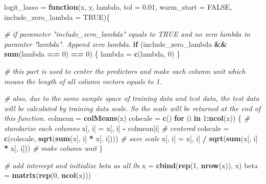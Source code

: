 \documentclass[
]{article}
\newenvironment{Shaded}{\begin{snugshade}}{\end{snugshade}}
\newcommand{\AttributeTok}[1]{\textcolor[rgb]{0.13,0.29,0.53}{#1}}
\newcommand{\CommentTok}[1]{\textcolor[rgb]{0.56,0.35,0.01}{\textit{#1}}}
\newcommand{\ConstantTok}[1]{\textcolor[rgb]{0.56,0.35,0.01}{#1}}
\newcommand{\ControlFlowTok}[1]{\textcolor[rgb]{0.13,0.29,0.53}{\textbf{#1}}}
\newcommand{\DecValTok}[1]{\textcolor[rgb]{0.00,0.00,0.81}{#1}}
\newcommand{\FloatTok}[1]{\textcolor[rgb]{0.00,0.00,0.81}{#1}}
\newcommand{\FunctionTok}[1]{\textcolor[rgb]{0.13,0.29,0.53}{\textbf{#1}}}
\newcommand{\NormalTok}[1]{#1}
\newcommand{\OtherTok}[1]{\textcolor[rgb]{0.56,0.35,0.01}{#1}}
\newcommand{\SpecialCharTok}[1]{\textcolor[rgb]{0.81,0.36,0.00}{\textbf{#1}}}
\begin{document}
\begin{Shaded}
\begin{Highlighting}[]
\NormalTok{logit\_lasso }\OtherTok{=} \ControlFlowTok{function}\NormalTok{(x, y, lambda, }\AttributeTok{tol =} \FloatTok{0.01}\NormalTok{, }\AttributeTok{warm\_start =} \ConstantTok{FALSE}\NormalTok{, }\AttributeTok{include\_zero\_lambda =} \ConstantTok{TRUE}\NormalTok{)\{}
  
  \CommentTok{\# if parameter "include\_zero\_lambda" equals to TRUE and no zero lambda in paramter "lambda". Append zero lambda.}
  \ControlFlowTok{if}\NormalTok{ (include\_zero\_lambda }\SpecialCharTok{\&\&} \FunctionTok{sum}\NormalTok{(lambda }\SpecialCharTok{==} \DecValTok{0}\NormalTok{) }\SpecialCharTok{==} \DecValTok{0}\NormalTok{) \{}
\NormalTok{    lambda }\OtherTok{=} \FunctionTok{c}\NormalTok{(lambda, }\DecValTok{0}\NormalTok{)}
\NormalTok{  \}}
  
  
  
  \CommentTok{\# this part is used to center the predictors and make each column unit which means the length of all column vectors equals to 1. }
  
  \CommentTok{\# also, due to the same sample space of training data and test data, the test data will be calculated by training data scale. So the scale will be returned at the end of this function.}
\NormalTok{  colmean }\OtherTok{=} \FunctionTok{colMeans}\NormalTok{(x)}
\NormalTok{  colscale }\OtherTok{=} \FunctionTok{c}\NormalTok{()}
  \ControlFlowTok{for}\NormalTok{ (i }\ControlFlowTok{in} \DecValTok{1}\SpecialCharTok{:}\FunctionTok{ncol}\NormalTok{(x)) \{ }\CommentTok{\# standarize each columns}
\NormalTok{    x[, i] }\OtherTok{=}\NormalTok{ x[, i] }\SpecialCharTok{{-}}\NormalTok{ colmean[i] }\CommentTok{\# centered}
\NormalTok{    colscale }\OtherTok{=} \FunctionTok{c}\NormalTok{(colscale, }\FunctionTok{sqrt}\NormalTok{(}\FunctionTok{sum}\NormalTok{(x[, i] }\SpecialCharTok{*}\NormalTok{ x[, i]))) }\CommentTok{\# save scale}
\NormalTok{    x[, i] }\OtherTok{=}\NormalTok{ x[, i] }\SpecialCharTok{/} \FunctionTok{sqrt}\NormalTok{(}\FunctionTok{sum}\NormalTok{(x[, i] }\SpecialCharTok{*}\NormalTok{ x[, i])) }\CommentTok{\# make column unit}
\NormalTok{  \}}
  
  \CommentTok{\# add intercept and initialize beta as all 0s}
\NormalTok{  x }\OtherTok{=} \FunctionTok{cbind}\NormalTok{(}\FunctionTok{rep}\NormalTok{(}\DecValTok{1}\NormalTok{, }\FunctionTok{nrow}\NormalTok{(x)), x)}
\NormalTok{  beta }\OtherTok{=} \FunctionTok{matrix}\NormalTok{(}\FunctionTok{rep}\NormalTok{(}\DecValTok{0}\NormalTok{, }\FunctionTok{ncol}\NormalTok{(x)))}
  

\end{Highlighting}
\end{Shaded}
\end{document}

